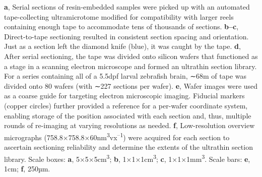 \documentclass{article}
\begin{document}
\noindent\textbf{a}, Serial sections of resin-embedded samples were picked up with an automated tape-collecting ultramicrotome modified for compatibility with larger reels containing enough tape to accommodate tens of thousands of sections. \textbf{b–c}, Direct-to-tape sectioning resulted in consistent section spacing and orientation. Just as a section left the diamond knife (blue), it was caught by the tape. \textbf{d}, After serial sectioning, the tape was divided onto silicon wafers that functioned as a stage in a scanning electron microscope and formed an ultrathin section library. For a series containing all of a 5.5dpf larval zebrafish brain, ∼68m of tape was divided onto 80 wafers (with ∼227 sections per wafer). \textbf{e}, Wafer images were used as a coarse guide for targeting electron microscopic imaging. Fiducial markers (copper circles) further provided a reference for a per-wafer coordinate system, enabling storage of the position associated with each section and, thus, multiple rounds of re-imaging at varying resolutions as needed. \textbf{f}, Low-resolution overview micrographs (758.8×758.8×60nm\textsuperscript{3}vx\textsuperscript{–1}) were acquired for each section to ascertain sectioning
reliability and determine the extents of the ultrathin section library. Scale boxes: \textbf{a}, 5×5×5cm\textsuperscript{3}; \textbf{b}, 1×1×1cm\textsuperscript{3}; \textbf{c}, 1×1×1mm\textsuperscript{3}. Scale bars: \textbf{e}, 1cm; \textbf{f}, 250µm.
\end{document}
